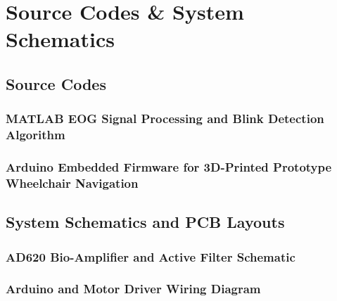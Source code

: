 \chapter{Source Codes \& System Schematics}
\label{app:appendix_a}




\section{Source Codes}
\label{sec:app_codes}

\subsection{MATLAB EOG Signal Processing and Blink Detection Algorithm}
\label{subsec:app_matlab_code}

\subsection[Arduino Firmware for Prototype Wheelchair Navigation]{Arduino Embedded Firmware for 3D-Printed Prototype Wheelchair Navigation}
\label{subsec:app_arduino_code}

\section{System Schematics and PCB Layouts}
\label{sec:app_schematics}

\subsection{AD620 Bio-Amplifier and Active Filter Schematic}
\label{subsec:app_schematic_analog}

\subsection{Arduino and Motor Driver Wiring Diagram}
\label{subsec:app_schematic_digital}
